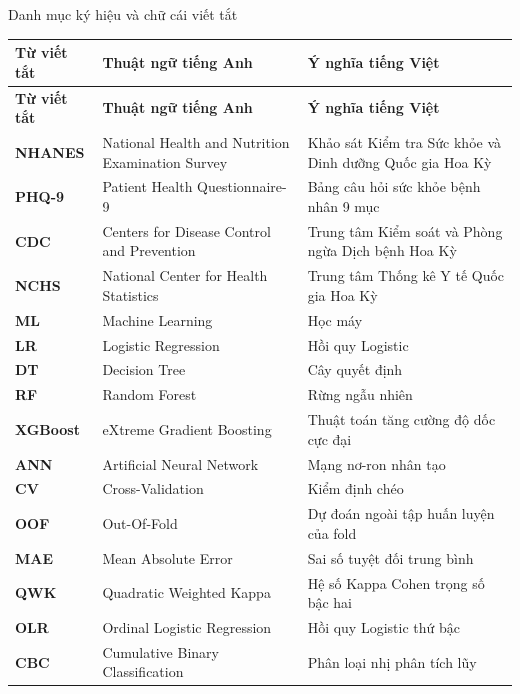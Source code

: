 \documentclass{uetgraduation}
\begin{document}
\begin{contentlisting}
\tableofcontents
\listoffigures
\listoftables

\begin{contentlistingsection}{Danh mục ký hiệu và chữ cái viết tắt}
\begin{longtable}{p{2.5cm} p{6.5cm} p{6.0cm}}
\toprule
\textbf{Từ viết tắt} & \textbf{Thuật ngữ tiếng Anh} & \textbf{Ý nghĩa tiếng Việt} \\
\midrule
\endfirsthead
\toprule
\textbf{Từ viết tắt} & \textbf{Thuật ngữ tiếng Anh} & \textbf{Ý nghĩa tiếng Việt} \\
\midrule
\endhead
\bottomrule
\endfoot
\textbf{NHANES} & National Health and Nutrition Examination Survey & Khảo sát Kiểm tra Sức khỏe và Dinh dưỡng Quốc gia Hoa Kỳ \\
\textbf{PHQ-9}  & Patient Health Questionnaire-9 & Bảng câu hỏi sức khỏe bệnh nhân 9 mục \\
\textbf{CDC}    & Centers for Disease Control and Prevention & Trung tâm Kiểm soát và Phòng ngừa Dịch bệnh Hoa Kỳ \\
\textbf{NCHS}   & National Center for Health Statistics & Trung tâm Thống kê Y tế Quốc gia Hoa Kỳ \\
\textbf{ML}     & Machine Learning & Học máy \\
\textbf{LR}     & Logistic Regression & Hồi quy Logistic \\
\textbf{DT}     & Decision Tree & Cây quyết định \\
\textbf{RF}     & Random Forest & Rừng ngẫu nhiên \\
\textbf{XGBoost}& eXtreme Gradient Boosting & Thuật toán tăng cường độ dốc cực đại \\
\textbf{ANN}    & Artificial Neural Network & Mạng nơ-ron nhân tạo \\
\textbf{CV}     & Cross-Validation & Kiểm định chéo \\
\textbf{OOF}    & Out-Of-Fold & Dự đoán ngoài tập huấn luyện của fold \\
\textbf{MAE}    & Mean Absolute Error & Sai số tuyệt đối trung bình \\
\textbf{QWK}    & Quadratic Weighted Kappa & Hệ số Kappa Cohen trọng số bậc hai \\
\textbf{OLR}    & Ordinal Logistic Regression & Hồi quy Logistic thứ bậc \\
\textbf{CBC}    & Cumulative Binary Classification & Phân loại nhị phân tích lũy \\

\end{longtable}
\end{contentlistingsection}
\end{contentlisting}
\end{document}
